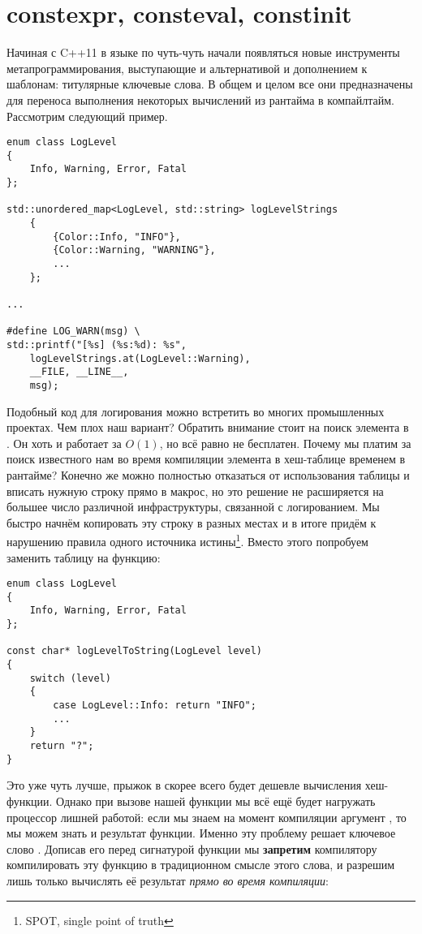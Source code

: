 \section{constexpr, consteval, constinit}
Начиная с C++11 в языке по чуть-чуть начали появляться новые инструменты метапрограммирования, выступающие и альтернативой и дополнением к шаблонам: титулярные ключевые слова. В общем и целом все они предназначены для переноса выполнения некоторых вычислений из рантайма в компайлтайм. Рассмотрим следующий пример.
\begin{verbatim}
enum class LogLevel
{
    Info, Warning, Error, Fatal
};

std::unordered_map<LogLevel, std::string> logLevelStrings
    {
        {Color::Info, "INFO"},
        {Color::Warning, "WARNING"},
        ...
    };

...

#define LOG_WARN(msg) \
std::printf("[%s] (%s:%d): %s",
    logLevelStrings.at(LogLevel::Warning),
    __FILE, __LINE__,
    msg);
\end{verbatim}
Подобный код для логирования можно встретить во многих промышленных проектах. Чем плох наш вариант? Обратить внимание стоит на поиск элемента в . Он хоть и работает за $O(1)$, но всё равно не бесплатен. Почему мы платим за поиск известного нам во время компиляции элемента в хеш-таблице временем в рантайме? Конечно же можно полностью отказаться от использования таблицы и вписать нужную строку прямо в макрос, но это решение не расширяется на большее число различной инфраструктуры, связанной с логированием. Мы быстро начнём копировать эту строку в разных местах и в итоге придём к нарушению правила одного источника истины\footnote{SPOT, single point of truth}. Вместо этого попробуем заменить таблицу на функцию:
\begin{verbatim}
enum class LogLevel
{
    Info, Warning, Error, Fatal
};

const char* logLevelToString(LogLevel level)
{
    switch (level)
    {
        case LogLevel::Info: return "INFO";
        ...
    }
    return "?";
}
\end{verbatim}
Это уже чуть лучше, прыжок в  скорее всего будет дешевле вычисления хеш-функции. Однако при вызове нашей функции мы всё ещё будет нагружать процессор лишней работой: если мы знаем на момент компиляции аргумент , то мы можем знать и результат функции. Именно эту проблему решает ключевое слово . Дописав его перед сигнатурой функции мы \textbf{запретим} компилятору компилировать эту функцию в традиционном смысле этого слова, и разрешим лишь только вычислять её результат \textit{прямо во время компиляции}:
